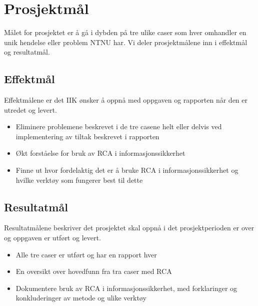 \section{Prosjektmål}
\label{sec:prosjektmaal}
Målet for prosjektet er å gå i dybden på tre ulike caser som hver omhandler en unik hendelse eller problem NTNU har. Vi deler prosjektmålene inn i effektmål og resultatmål.

\subsection{Effektmål}
Effektmålene er det IIK ønsker å oppnå med oppgaven og rapporten når den er utredet og levert.
\begin{itemize}
    \item Eliminere problemene beskrevet i de tre casene helt eller delvis ved implementering av tiltak beskrevet i rapporten
    \item Økt forståelse for bruk av RCA i informasjonssikkerhet
    \item Finne ut hvor fordelaktig det er å bruke RCA i informasjonssikkerhet og hvilke verktøy som fungerer best til dette
\end{itemize}

\subsection{Resultatmål}
Resultatmålene beskriver det prosjektet skal oppnå i det prosjektperioden er over og oppgaven er utført og levert.

\begin{itemize}
    \item Alle tre caser er utført og har en rapport hver
    \item En oversikt over hovedfunn fra tra caser med RCA
    \item Dokumentere bruk av RCA i informasjonssikkerhet, med forklaringer og konkluderinger av metode og ulike verktøy
\end{itemize}